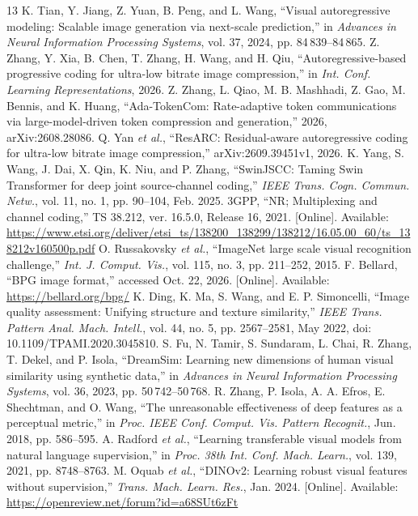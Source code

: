 \begin{thebibliography}{13}
 K. Tian, Y. Jiang, Z. Yuan, B. Peng, and L. Wang, ``Visual autoregressive modeling: Scalable image generation via next-scale prediction,'' in \emph{Advances in Neural Information Processing Systems}, vol. 37, 2024, pp. 84\,839--84\,865.
 Z. Zhang, Y. Xia, B. Chen, T. Zhang, H. Wang, and H. Qiu, ``Autoregressive-based progressive coding for ultra-low bitrate image compression,'' in \emph{Int. Conf. Learning Representations}, 2026.
 Z. Zhang, L. Qiao, M. B. Mashhadi, Z. Gao, M. Bennis, and K. Huang, ``Ada-TokenCom: Rate-adaptive token communications via large-model-driven token compression and generation,'' 2026, arXiv:2608.28086.
 Q. Yan \emph{et al.}, ``ResARC: Residual-aware autoregressive coding for ultra-low bitrate image compression,'' arXiv:2609.39451v1, 2026.
 K. Yang, S. Wang, J. Dai, X. Qin, K. Niu, and P. Zhang, ``SwinJSCC: Taming Swin Transformer for deep joint source-channel coding,'' \emph{IEEE Trans. Cogn. Commun. Netw.}, vol. 11, no. 1, pp. 90--104, Feb. 2025.
 3GPP, ``NR; Multiplexing and channel coding,'' TS 38.212, ver. 16.5.0, Release 16, 2021. [Online]. Available: \url{https://www.etsi.org/deliver/etsi_ts/138200_138299/138212/16.05.00_60/ts_138212v160500p.pdf}
 O. Russakovsky \emph{et al.}, ``ImageNet large scale visual recognition challenge,'' \emph{Int. J. Comput. Vis.}, vol. 115, no. 3, pp. 211--252, 2015.
 F. Bellard, ``BPG image format,'' accessed Oct. 22, 2026. [Online]. Available: \url{https://bellard.org/bpg/}
 K. Ding, K. Ma, S. Wang, and E. P. Simoncelli, ``Image quality assessment: Unifying structure and texture similarity,'' \emph{IEEE Trans. Pattern Anal. Mach. Intell.}, vol. 44, no. 5, pp. 2567--2581, May 2022, doi: 10.1109/TPAMI.2020.3045810.
 S. Fu, N. Tamir, S. Sundaram, L. Chai, R. Zhang, T. Dekel, and P. Isola, ``DreamSim: Learning new dimensions of human visual similarity using synthetic data,'' in \emph{Advances in Neural Information Processing Systems}, vol. 36, 2023, pp. 50\,742--50\,768.
 R. Zhang, P. Isola, A. A. Efros, E. Shechtman, and O. Wang, ``The unreasonable effectiveness of deep features as a perceptual metric,'' in \emph{Proc. IEEE Conf. Comput. Vis. Pattern Recognit.}, Jun. 2018, pp. 586--595.
 A. Radford \emph{et al.}, ``Learning transferable visual models from natural language supervision,'' in \emph{Proc. 38th Int. Conf. Mach. Learn.}, vol. 139, 2021, pp. 8748--8763.
 M. Oquab \emph{et al.}, ``DINOv2: Learning robust visual features without supervision,'' \emph{Trans. Mach. Learn. Res.}, Jan. 2024. [Online]. Available: \url{https://openreview.net/forum?id=a68SUt6zFt}
\end{thebibliography}
